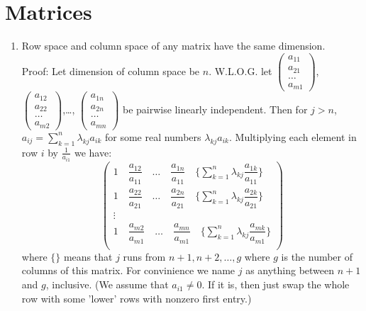 \documentclass[11pt,a4paper]{article}
\begin{document}
\section {Matrices}
\begin {enumerate}
\item Row space and column space of any matrix have the same dimension.\\
Proof: Let dimension of column space be $n$. W.L.O.G. let  $\left( \begin{array}{cccc} a_{11} \\ a_{21}\\  \ldots \\ a_{m1} \end{array} \right)$,  $\left( \begin{array}{cccc} a_{12} \\ a_{22}\\  \ldots \\ a_{m2} \end{array} \right)$,\ldots , $\left( \begin{array}{cccc} a_{1n} \\ a_{2n}\\  \ldots \\ a_{mn} \end{array} \right)$ be pairwise linearly independent. Then for $j>n$, 
$a_{ij}=\sum_{k=1}^{n} \lambda_{kj}a_{ik}$ for some real numbers $\lambda_{kj}a_{ik}$. Multiplying each element in row $i$ by $\frac{1}{a_{i1}}$ we have: \[\left( \begin{array}{cccc}
1 \quad \dfrac{a_{12}}{a_{11}} \quad \ldots \quad \dfrac{a_{1n}}{a_{11}} \quad \{\displaystyle\sum_{k=1}^{n} \lambda_{kj}\dfrac{a_{1k}}{a_{11}}\}\\
1 \quad \dfrac{a_{22}}{a_{21}} \quad \ldots \quad \dfrac{a_{2n}}{a_{21}} \quad \{\displaystyle\sum_{k=1}^{n} \lambda_{kj}\dfrac{a_{2k}}{a_{21}}\}\\
\vdots\\
1 \quad \dfrac{a_{m2}}{a_{m1}} \quad \ldots \quad \dfrac{a_{mn}}{a_{m1}} \quad \{\displaystyle\sum_{k=1}^{n} \lambda_{kj}\dfrac{a_{mk}}{a_{m1}}\}\\
\end{array} \right)\]
where $\{\}$ means that $j$ runs from $n+1, n+2,\ldots, g$ where $g$ is the number of columns of this matrix. For convinience we name $j$ as anything between $n+1$ and $g$, inclusive. (We assume that $a_{i1}\neq 0$. If it is, then just swap the whole row with some 'lower' rows with nonzero first entry.)


\end{enumerate}
\end{document}
